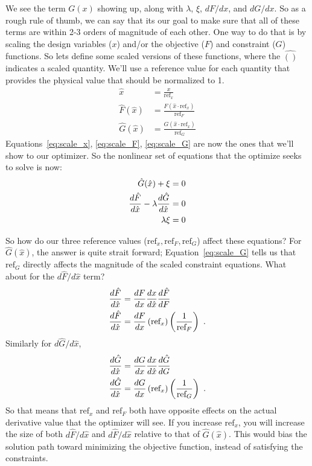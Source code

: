 \documentclass[conf]{new-aiaa}
\begin{document}
    We see the term $G(x)$ showing up, along with $\lambda$, $\xi$, $dF/dx$, and $dG/dx$. 
    So as a rough rule of thumb, we can say that its our goal to make sure that all of these terms are within 2-3 orders of magnitude of each other. 
    One way to do that is by scaling the design variables ($x$) and/or the objective ($F$) and constraint ($G$) functions. 
    So lets define some scaled versions of these functions, where the $\hat{()}$ indicates a scaled quantity.
    We'll use a reference value for each quantity that provides the physical value that should be normalized to 1. 
    \begin{align}
        \hat{x} &= \frac{x}{\text{ref}_x} \label{eq:scale_x}\\
        \hat{F}(\hat{x}) &= \frac{F(\hat{x} \cdot \text{ref}_x)}{\text{ref}_F} \label{eq:scale_F}\\
        \hat{G}(\hat{x}) &= \frac{G(\hat{x} \cdot \text{ref}_x)}{\text{ref}_G} \label{eq:scale_G}
    \end{align}
    Equations~\eqref{eq:scale_x}, \eqref{eq:scale_F}, \eqref{eq:scale_G} are now the ones that we'll show to our optimizer. 
    So the nonlinear set of equations that the optimize seeks to solve is now: 
    \begin{align}
        \hat{G}(\hat{x}) + \xi &= 0 \notag \\
        \frac{d\hat{F}}{d\hat{x}} - \lambda \frac{d\hat{G}}{d\hat{x}} &= 0 \notag \\
        \lambda \xi &= 0
        \label{eq:almost_kkt}
    \end{align}

    So how do our three reference values ($\text{ref}_x, \text{ref}_F, \text{ref}_G$) affect these equations? 
    For $\hat{G}(\hat{x})$, the answer is quite strait forward; 
    Equation~\eqref{eq:scale_G} tells us that $\text{ref}_G$ directly affects the magnitude of the scaled constraint equations. 
    What about for the $d \hat{F}/d\hat{x}$ term? 
    \begin{align}
        \frac{d\hat{F}}{d\hat{x}} &= \frac{dF}{dx} \frac{dx}{d\hat{x}} \frac{d\hat{F}}{dF} \notag \\
        \frac{d\hat{F}}{d\hat{x}} &= \frac{dF}{dx} \left(\text{ref}_x \right) \left(\frac{1}{\text{ref}_F}\right) \ .
    \end{align}
    Similarly for $d \hat{G}/d\hat{x}$, 
    \begin{align}
        \frac{d\hat{G}}{d\hat{x}} &= \frac{dG}{dx} \frac{dx}{d\hat{x}} \frac{d\hat{G}}{dG} \notag \\
        \frac{d\hat{G}}{d\hat{x}} &= \frac{dG}{dx} \left(\text{ref}_x \right) \left(\frac{1}{\text{ref}_G}\right) \ .
    \end{align}
    So that means that $\text{ref}_x$ and $\text{ref}_F$ both have opposite effects on the actual derivative value that the optimizer will see. 
    If you increase $\text{ref}_x$, you will increase the size of both $d\hat{F}/d\hat{x}$ and $d\hat{F}/d\hat{x}$ relative to that of $\hat{G}(\hat{x})$. 
    This would bias the solution path toward minimizing the objective function, instead of satisfying the constraints. 
\end{document}
